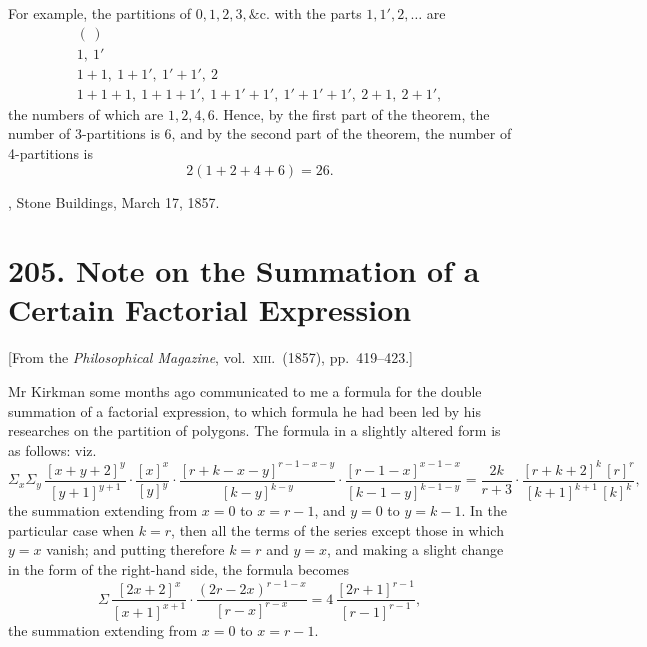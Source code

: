 \documentclass[12pt,a4paper]{article}
\theoremstyle{plain}
\begin{document}
For example, the partitions of $0,1,2,3,\&\mathrm{c}.$ with the parts $1,1',2,\ldots$ are
\[
\begin{array}{l}
(\,) \\
1,\ 1'\\
1+1,\ 1+1',\ 1'+1',\ 2\\
1+1+1,\ 1+1+1',\ 1+1'+1',\ 1'+1'+1',\ 2+1,\ 2+1',
\end{array}
\]
the numbers of which are $1,2,4,6$. Hence, by the first part of the theorem, the number of 3-partitions is 6, and by the second part of the theorem, the number of 4-partitions is
\[
2(1+2+4+6)=26.
\]

\bigskip

, Stone Buildings, March 17, 1857.

\vfill\newpage


\section*{205. Note on the Summation of a Certain Factorial Expression}

\begin{center}
[From the \textit{Philosophical Magazine}, vol.~\textsc{xiii}.\ (1857), pp.~419--423.]
\end{center}

\medskip

\noindent Mr Kirkman some months ago communicated to me a formula for the double summation of a factorial expression, to which formula he had been led by his researches on the partition of polygons. The formula in a slightly altered form is as follows: viz.
\[
\Sigma_x\Sigma_y\,\frac{[x+y+2]^y}{[y+1]^{y+1}}\cdot\frac{[x]^x}{[y]^y}\cdot\frac{[r+k-x-y]^{r-1-x-y}}{[k-y]^{k-y}}\cdot\frac{[r-1-x]^{x-1-x}}{[k-1-y]^{k-1-y}}=\frac{2k}{r+3}\cdot\frac{[r+k+2]^k\,[r]^r}{[k+1]^{k+1}\,[k]^k},
\]
the summation extending from $x=0$ to $x=r-1$, and $y=0$ to $y=k-1$. In the particular case when $k=r$, then all the terms of the series except those in which $y=x$ vanish; and putting therefore $k=r$ and $y=x$, and making a slight change in the form of the right-hand side, the formula becomes
\[
\Sigma\,\frac{[2x+2]^x}{[x+1]^{x+1}}\cdot\frac{(2r-2x)^{r-1-x}}{[r-x]^{r-x}}=4\,\frac{[2r+1]^{r-1}}{[r-1]^{r-1}},
\]
the summation extending from $x=0$ to $x=r-1$.
\end{document}

